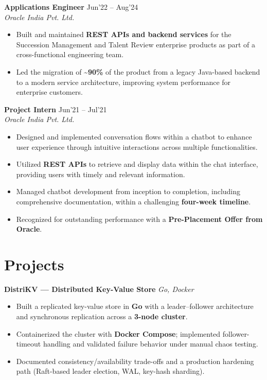 \documentclass[10pt,a4paper]{article}
\newcommand{\resumeItem}[1]{\item[\textcolor{primary}{\textbullet}] #1}
\begin{document}
\vspace{1pt}
\textbf{Applications Engineer} \hfill Jun'22 -- Aug'24\\
\textit{Oracle India Pvt. Ltd.}
\begin{itemize}[leftmargin=1.05em, nosep, topsep=0pt, itemsep=0pt, parsep=0pt]
    \resumeItem{Built and maintained \textbf{REST APIs and backend services} for the Succession Management and Talent Review enterprise products as part of a cross-functional engineering team.}
    \resumeItem{Led the migration of \textbf{\textasciitilde90\%} of the product from a legacy Java-based backend to a modern service architecture, improving system performance for enterprise customers.}
\end{itemize}

\vspace{1pt}
\textbf{Project Intern} \hfill Jun'21 -- Jul'21\\
\textit{Oracle India Pvt. Ltd.}
\begin{itemize}[leftmargin=1.05em, nosep, topsep=0pt, itemsep=0pt, parsep=0pt]
    \resumeItem{Designed and implemented conversation flows within a chatbot to enhance user experience through intuitive interactions across multiple functionalities.}
    \resumeItem{Utilized \textbf{REST APIs} to retrieve and display data within the chat interface, providing users with timely and relevant information.}
    \resumeItem{Managed chatbot development from inception to completion, including comprehensive documentation, within a challenging \textbf{four-week timeline}.}
    \resumeItem{Recognized for outstanding performance with a \textbf{Pre-Placement Offer from Oracle}.}
\end{itemize}

\section{Projects}
\small

\textbf{DistriKV --- Distributed Key-Value Store} \hfill \textit{Go, Docker}
\begin{itemize}[leftmargin=1.05em, nosep, topsep=0pt, itemsep=0pt, parsep=0pt]
    \resumeItem{Built a replicated key-value store in \textbf{Go} with a leader--follower architecture and synchronous replication across a \textbf{3-node cluster}.}
    \resumeItem{Containerized the cluster with \textbf{Docker Compose}; implemented follower-timeout handling and validated failure behavior under manual chaos testing.}
    \resumeItem{Documented consistency/availability trade-offs and a production hardening path (Raft-based leader election, WAL, key-hash sharding).}
\end{itemize}
\end{document}

